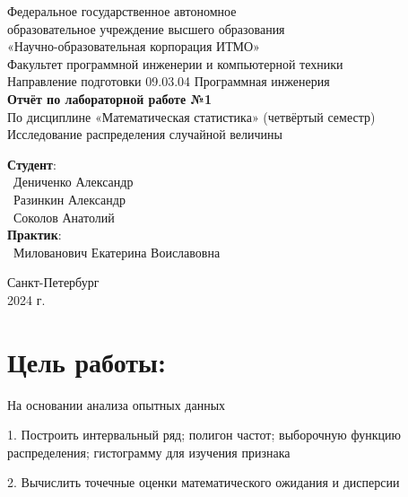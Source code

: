 \documentclass{article}
\begin{document}
\begin{center}
    \Large
    Федеральное государственное автономное \\
    образовательное учреждение высшего образования \\ 
    «Научно-образовательная корпорация ИТМО»\\
    \vspace{0.5cm}
    \large
    Факультет программной инженерии и компьютерной техники \\
    Направление подготовки 09.03.04 Программная инженерия \\
    \vspace{1cm}
    \Large
    \textbf{Отчёт по лабораторной работе №1} \\
    По дисциплине «Математическая статистика» (четвёртый семестр)\\
    Исследование распределения случайной величины\\
    \large
    \vspace{8cm}

    \begin{minipage}{.33\textwidth}
    \end{minipage}
    \hfill
    \begin{minipage}{.4\textwidth}
    
        \textbf{Студент}: \vspace{.1cm} \\
        \ Дениченко Александр\\
        \ Разинкин Александр\\
        \ Соколов Анатолий\\
        \textbf{Практик}:  \\
        \ Милованович Екатерина Воиславовна
    \end{minipage}
    \vfill
Санкт-Петербург\\ 2024 г.
\end{center}

\newpage
\section*{Цель работы:}
\large

На основании анализа опытных данных

1. Построить интервальный ряд; полигон частот; выборочную функцию распределения; гистограмму для изучения признака

2. Вычислить точечные оценки математического ожидания и дисперсии
\end{document}
